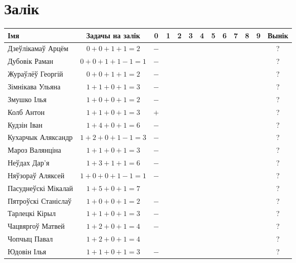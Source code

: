 \documentclass[12pt, a4paper]{extarticle}
\begin{document}
    \section{Залік}
    \begin{table}[H]
        \begin{minipage}{\textwidth}
            \begin{tabular}{|l|c|c|c|c|c|c|c|c|c|c|c|c|}
                \hline
                Імя                 & Задачы на залік &  0  &  1  &  2  &  3  &  4  &  5  &  6  &  7  &  8  &  9  &  Вынік  \\ \hline
                Дзеўлікамаў Арцём   &   $0+0+1+1=2$   & $-$ &  &  &  &  &  &  &  &  &  &  ? \\ \hline
                Дубовік Раман       &  $0+0+1+1-1=1$  & $-$ &  &  &  &  &  &  &  &  &  &  ? \\ \hline
                Жураўлёў Георгій    &   $0+0+1+1=2$   & $-$ &  &  &  &  &  &  &  &  &  &  ? \\ \hline
                Зімнікава Ульяна    &   $1+1+0+1=3$   & $-$ &  &  &  &  &  &  &  &  &  &  ? \\ \hline
                Змушко Ілья         &   $1+0+0+1=2$   & $-$ &  &  &  &  &  &  &  &  &  &  ? \\ \hline
                Колб Антон          &   $1+1+0+1=3$   & $+$ &  &  &  &  &  &  &  &  &  &  ? \\ \hline
                Кудзін Іван         &   $1+4+0+1=6$   & $-$ &  &  &  &  &  &  &  &  &  &  ? \\ \hline
                Кухарчык Аляксандр  &  $1+2+0+1-1=3$  & $-$ &  &  &  &  &  &  &  &  &  &  ? \\ \hline
                Мароз Валянціна     &   $1+1+0+1=3$   & $-$ &  &  &  &  &  &  &  &  &  &  ? \\ \hline
                Неўдах Дар'я        &   $1+3+1+1=6$   & $-$ &  &  &  &  &  &  &  &  &  &  ? \\ \hline
                Няўзораў Аляксей    &  $1+0+0+1-1=1$  & $-$ &  &  &  &  &  &  &  &  &  &  ? \\ \hline
                Пасуднеўскі Мікалай &   $1+5+0+1=7$   &  &  &  &  &  &  &  &  &  &  &  ? \\ \hline
                Пятроўскі Станіслаў &   $1+0+0+1=2$   & $-$ &  &  &  &  &  &  &  &  &  &  ? \\ \hline
                Тарлецкі Кірыл      &   $1+1+0+1=3$   & $-$ &  &  &  &  &  &  &  &  &  &  ? \\ \hline
                Чацвяргоў Матвей    &   $1+2+0+1=4$   & $-$ &  &  &  &  &  &  &  &  &  &  ? \\ \hline
                Чопчыц Павал        &   $1+2+0+1=4$   &  &  &  &  &  &  &  &  &  &  &  ? \\ \hline
                Юдовін Ілья         &   $1+1+0+1=3$   & $-$ &  &  &  &  &  &  &  &  &  &  ? \\ \hline
            \end{tabular}
        \end{minipage}
    \end{table}
\end{document}
